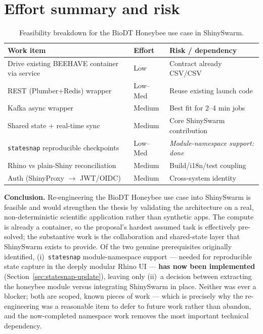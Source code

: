\documentclass[12pt,a4paper]{article}
\begin{document}
\section{Effort summary and risk}

\begin{table}[h]
\centering
\small
\begin{tabular}{@{}lll@{}}
\toprule
\textbf{Work item} & \textbf{Effort} & \textbf{Risk / dependency} \\
\midrule
Drive existing BEEHAVE container via service & Low & Contract already CSV/CSV \\
REST (Plumber+Redis) wrapper & Low--Med & Reuse existing launch code \\
Kafka async wrapper & Medium & Best fit for 2--4 min jobs \\
Shared state + real-time sync & Medium & Core ShinySwarm contribution \\
\texttt{statesnap} reproducible checkpoints & Low--Med & \emph{Module-namespace support: done} \\
Rhino vs plain-Shiny reconciliation & Medium & Build/i18n/test coupling \\
Auth (ShinyProxy $\to$ JWT/OIDC) & Medium & Cross-system identity \\
\bottomrule
\end{tabular}
\caption{Feasibility breakdown for the BioDT Honeybee use case in ShinySwarm.}
\end{table}

\textbf{Conclusion.} Re-engineering the BioDT Honeybee use case into ShinySwarm
is feasible and would strengthen the thesis by validating the architecture on a
real, non-deterministic scientific application rather than synthetic apps. The
compute is already a container, so the proposal's hardest assumed task is
effectively pre-solved; the substantive work is the collaboration and shared-state
layer that ShinySwarm exists to provide. Of the two genuine prerequisites
originally identified, (i)~\texttt{statesnap} module-namespace support --- needed
for reproducible state capture in the deeply modular Rhino UI --- \textbf{has now
been implemented} (Section~\ref{sec:statesnap-update}), leaving only (ii)~a
decision between extracting the honeybee module versus integrating ShinySwarm in
place. Neither was ever a blocker; both are scoped, known pieces of work --- which
is precisely why the re-engineering was a reasonable item to defer to future work
rather than abandon, and the now-completed namespace work removes the most
important technical dependency.
\end{document}
